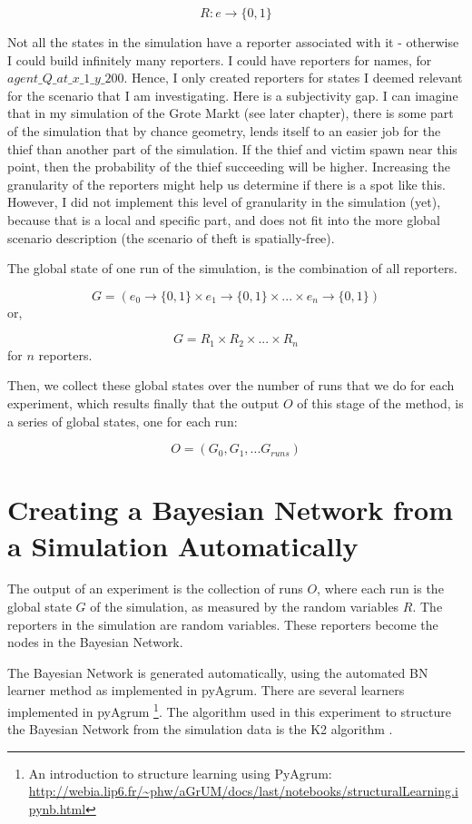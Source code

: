 \[ R : e \rightarrow \{0, 1\} \]

Not all the states in the simulation have a reporter associated with it - otherwise I could build infinitely many reporters. I could have reporters for names, for $agent\_Q\_at\_x\_1\_y\_200$. Hence, I only created reporters for states I deemed relevant for the scenario that I am investigating. Here is a subjectivity gap. I can imagine that in my simulation of the Grote Markt (see later chapter), there is some part of the simulation that by chance geometry, lends itself to an easier job for the thief than another part of the simulation. If the thief and victim spawn near this point, then the probability of the thief succeeding will be higher. Increasing the granularity of the reporters might help us determine if there is a spot like this. However, I did not implement this level of granularity in the simulation (yet), because that is a local and specific part, and does not fit into the more global scenario description (the scenario of theft is spatially-free).

The global state of one run of the simulation, is the combination of all reporters.

\[ G = (e_0 \rightarrow \{0, 1\} \times e_1 \rightarrow \{0, 1\} \times ... \times e_n \rightarrow \{0, 1\})\]
 or,
 
\[ G = R_1 \times R_2 \times... \times R_n\]
for $n$ reporters.

Then, we collect these global states over the number of runs that we do for each experiment, which results finally that the output $O$ of this stage of the method, is a series of global states, one for each run:

\[ O = (G_0, G_1, ... G_{runs})\]


\section{Creating a Bayesian Network from a Simulation Automatically}

The output of an experiment is the collection of runs $O$, where each run is the global state $G$ of the simulation, as measured by the random variables $R$. The reporters in the simulation are random variables. These reporters become the nodes in the Bayesian Network.

The Bayesian Network is generated automatically, using the automated BN learner method as implemented in pyAgrum. There are several learners implemented in pyAgrum \footnote{An introduction to structure learning using PyAgrum: \url{http://webia.lip6.fr/~phw/aGrUM/docs/last/notebooks/structuralLearning.ipynb.html}}. The algorithm used in this experiment to structure the Bayesian Network from the simulation data is the K2 algorithm \citep{Cooper1992}. 

